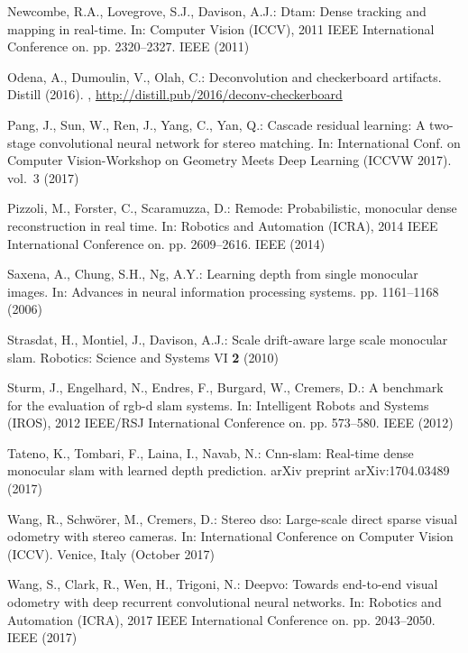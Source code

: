 \documentclass[runningheads]{llncs}
\begin{document}
\begin{thebibliography}{10}
Newcombe, R.A., Lovegrove, S.J., Davison, A.J.: Dtam: Dense tracking and
  mapping in real-time. In: Computer Vision (ICCV), 2011 IEEE International
  Conference on. pp. 2320--2327. IEEE (2011)

Odena, A., Dumoulin, V., Olah, C.: Deconvolution and checkerboard artifacts.
  Distill  (2016). ,
  \url{http://distill.pub/2016/deconv-checkerboard}

Pang, J., Sun, W., Ren, J., Yang, C., Yan, Q.: Cascade residual learning: A
  two-stage convolutional neural network for stereo matching. In: International
  Conf. on Computer Vision-Workshop on Geometry Meets Deep Learning (ICCVW
  2017). vol.~3 (2017)

Pizzoli, M., Forster, C., Scaramuzza, D.: Remode: Probabilistic, monocular
  dense reconstruction in real time. In: Robotics and Automation (ICRA), 2014
  IEEE International Conference on. pp. 2609--2616. IEEE (2014)

Saxena, A., Chung, S.H., Ng, A.Y.: Learning depth from single monocular images.
  In: Advances in neural information processing systems. pp. 1161--1168 (2006)

Strasdat, H., Montiel, J., Davison, A.J.: Scale drift-aware large scale
  monocular slam. Robotics: Science and Systems VI  \textbf{2} (2010)

Sturm, J., Engelhard, N., Endres, F., Burgard, W., Cremers, D.: A benchmark for
  the evaluation of rgb-d slam systems. In: Intelligent Robots and Systems
  (IROS), 2012 IEEE/RSJ International Conference on. pp. 573--580. IEEE (2012)

Tateno, K., Tombari, F., Laina, I., Navab, N.: Cnn-slam: Real-time dense
  monocular slam with learned depth prediction. arXiv preprint arXiv:1704.03489
   (2017)

Wang, R., Schw\"orer, M., Cremers, D.: Stereo dso: Large-scale direct sparse
  visual odometry with stereo cameras. In: International Conference on Computer
  Vision (ICCV). Venice, Italy (October 2017)

Wang, S., Clark, R., Wen, H., Trigoni, N.: Deepvo: Towards end-to-end visual
  odometry with deep recurrent convolutional neural networks. In: Robotics and
  Automation (ICRA), 2017 IEEE International Conference on. pp. 2043--2050.
  IEEE (2017)


\end{thebibliography}
\end{document}
